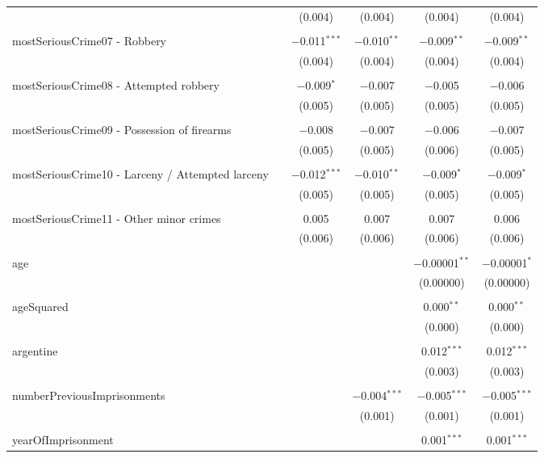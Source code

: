 \documentclass{article}
\begin{document}
\begin{table}[!htbp]
{\begin{tabular}{@{\extracolsep{5pt}}lccccc}
  &  & (0.004) & (0.004) & (0.004) & (0.004) \\ 
  & & & & & \\ 
 mostSeriousCrime07 - Robbery &  & $-$0.011$^{***}$ & $-$0.010$^{**}$ & $-$0.009$^{**}$ & $-$0.009$^{**}$ \\ 
  &  & (0.004) & (0.004) & (0.004) & (0.004) \\ 
  & & & & & \\ 
 mostSeriousCrime08 - Attempted robbery &  & $-$0.009$^{*}$ & $-$0.007 & $-$0.005 & $-$0.006 \\ 
  &  & (0.005) & (0.005) & (0.005) & (0.005) \\ 
  & & & & & \\ 
 mostSeriousCrime09 - Possession of firearms &  & $-$0.008 & $-$0.007 & $-$0.006 & $-$0.007 \\ 
  &  & (0.005) & (0.005) & (0.006) & (0.005) \\ 
  & & & & & \\ 
 mostSeriousCrime10 - Larceny / Attempted larceny &  & $-$0.012$^{***}$ & $-$0.010$^{**}$ & $-$0.009$^{*}$ & $-$0.009$^{*}$ \\ 
  &  & (0.005) & (0.005) & (0.005) & (0.005) \\ 
  & & & & & \\ 
 mostSeriousCrime11 - Other minor crimes &  & 0.005 & 0.007 & 0.007 & 0.006 \\ 
  &  & (0.006) & (0.006) & (0.006) & (0.006) \\ 
  & & & & & \\ 
 age &  &  &  & $-$0.00001$^{**}$ & $-$0.00001$^{*}$ \\ 
  &  &  &  & (0.00000) & (0.00000) \\ 
  & & & & & \\ 
 ageSquared &  &  &  & 0.000$^{**}$ & 0.000$^{**}$ \\ 
  &  &  &  & (0.000) & (0.000) \\ 
  & & & & & \\ 
 argentine &  &  &  & 0.012$^{***}$ & 0.012$^{***}$ \\ 
  &  &  &  & (0.003) & (0.003) \\ 
  & & & & & \\ 
 numberPreviousImprisonments &  &  & $-$0.004$^{***}$ & $-$0.005$^{***}$ & $-$0.005$^{***}$ \\ 
  &  &  & (0.001) & (0.001) & (0.001) \\ 
  & & & & & \\ 
 yearOfImprisonment &  &  &  & 0.001$^{***}$ & 0.001$^{***}$ \\ 

\end{tabular}}
\end{table}
\end{document}
